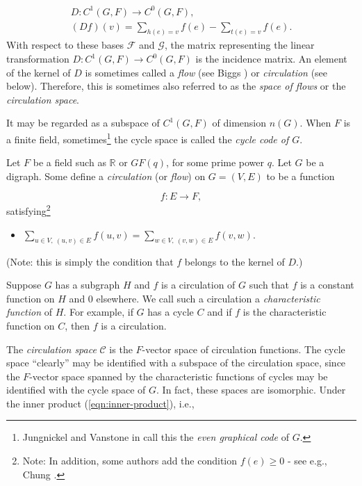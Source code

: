 \[
\begin{array}{c}
D:C^1(G,F)\to C^0(G,F),\\
(Df)(v) = \sum_{h(e)=v} f(e) - \sum_{t(e)=v} f(e).
\end{array}
\]
With respect to these bases ${\mathcal F}$ and
${\mathcal G}$, the matrix
representing the linear transformation $D:C^1(G,F)\to C^0(G,F)$
is the incidence matrix. An element of the kernel of $D$ is 
sometimes called a {\it flow} (see Biggs \cite{Biggs1997})
or {\it circulation} (see below).
Therefore, this is sometimes also referred to as the 
{\it space of flows} or the {\it circulation space}.

It may be regarded as a subspace of $C^1(G,F)$ of dimension $n(G)$.
When $F$ is a finite field, sometimes\footnote{Jungnickel and 
Vanstone in \cite{JungnickelVanstone1997} call 
this the {\it even graphical code} of $G$.}
the cycle space is called the {\it cycle code of $G$}.


Let $F$ be a field such as ${\mathbb{R}}$ or $GF(q)$, for some prime 
power $q$. Let $G$ be a digraph.
Some define a {\it circulation} (or {\it flow}) on $G=(V,E)$ 
to be a function

\[
f:E\to F,
\]
satisfying\footnote{Note: In addition, some authors add the 
condition $f(e)\geq 0$ - see e.g., Chung \cite{Chung2005}.}

\begin{itemize}
\item
$\sum_{u\in V,\ (u,v)\in E} f(u,v) = \sum_{w\in V,\ (v,w)\in E} f(v, w)$.
\end{itemize}
(Note: this is simply the condition that $f$ belongs to the
kernel of $D$.)

Suppose $G$ has a subgraph $H$ and 
$f$ is a circulation of $G$ such that $f$ is a constant function
on $H$ and $0$ elsewhere. We call such a circulation a
{\it characteristic function} of $H$.
For example, if $G$ has a cycle $C$ and if $f$ is the
characteristic function on $C$, then $f$ is a circulation.

The {\it circulation space} ${\mathcal C}$ is the $F$-vector space of 
circulation functions. 
The cycle space ``clearly'' may be identified with 
a subspace of the circulation space,
since the $F$-vector space spanned by the characteristic
functions of cycles may be identified with the cycle space of $G$. 
In fact, these spaces are isomorphic.
Under the inner product (\ref{eqn:inner-product}), i.e., 

